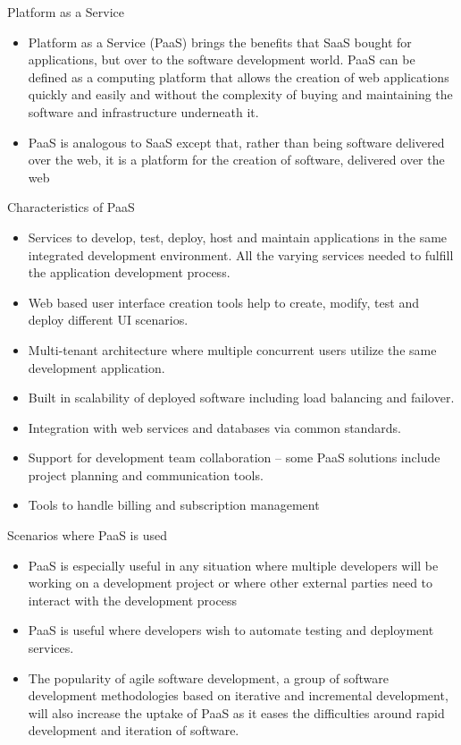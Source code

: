 \documentclass{SKP-beamer}
\begin{document}
\begin{frame}{Platform as a Service}
	\begin{itemize}
		\item Platform as a Service (PaaS) brings the benefits that SaaS bought for applications, but over to the software development world. PaaS can be defined as a computing platform that allows the creation of web applications quickly and easily and without the complexity of buying and maintaining the software and infrastructure underneath it.
		\item PaaS is analogous to SaaS except that, rather than being software delivered over the web, it is a platform for the creation of software, delivered over the web
	\end{itemize}
\end{frame}

 \begin{frame}{Characteristics of PaaS}
 	\begin{itemize}
 		\item Services to develop, test, deploy, host and maintain applications in the same integrated development environment. All the varying services needed to fulfill the application development process.
 		\item Web based user interface creation tools help to create, modify, test and deploy
 		different UI scenarios.
 		\item Multi-tenant architecture where multiple concurrent users utilize the same development application.
 		\item Built in scalability of deployed software including load balancing and failover.
 		\item Integration with web services and databases via common standards.
 		\item Support for development team collaboration – some PaaS solutions include project planning and communication tools.
 		\item Tools to handle billing and subscription management		
 	\end{itemize}
 \end{frame} 
 
 \begin{frame}{Scenarios where PaaS is used}
 	\begin{itemize}
 		\item PaaS is especially useful in any situation where multiple developers will be working on a development project or where other external parties need to interact with the development process
 		\item PaaS is useful where developers wish to automate testing and
 		deployment services.
 		\item The popularity of agile software development, a group of software development methodologies based on iterative and incremental development, will also increase the uptake of PaaS as it eases the difficulties around rapid development and iteration of software.	
 	\end{itemize}
 \end{frame} 
 
\end{document}
